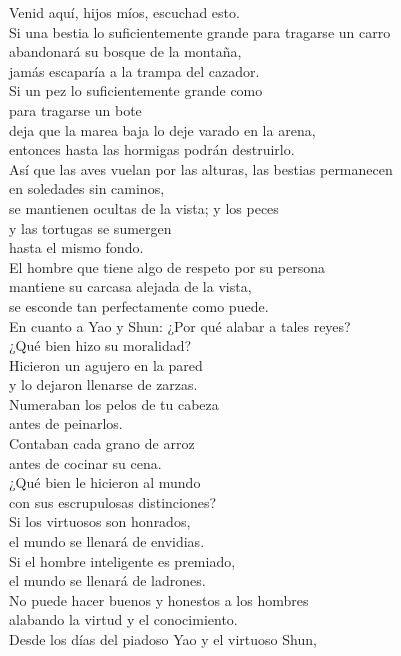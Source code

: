 \documentclass[book,b5paper,hidelinks,final]{memoir}
\begin{document}
	Venid aquí, hijos míos, escuchad esto.\\
	Si una bestia lo suficientemente grande para tragarse un carro\\
	abandonará su bosque de la montaña,\\
	jamás escaparía a la trampa del cazador.\\
	Si un pez lo suficientemente grande como\\
	para tragarse un bote\\
	deja que la marea baja lo deje varado en la arena,\\
	entonces hasta las hormigas podrán destruirlo.\\
	Así que las aves vuelan por las alturas, las bestias permanecen\\
	en soledades sin caminos,\\
	se mantienen ocultas de la vista; y los peces\\
	y las tortugas se sumergen\\
	hasta el mismo fondo.\\
	El hombre que tiene algo de respeto por su persona\\
	mantiene su carcasa alejada de la vista,\\
	se esconde tan perfectamente como puede.\\
	En cuanto a Yao y Shun: ¿Por qué alabar a tales reyes?\\
	¿Qué bien hizo su moralidad?\\
	Hicieron un agujero en la pared\\
	y lo dejaron llenarse de zarzas.\\
	Numeraban los pelos de tu cabeza\\
	antes de peinarlos.\\
	Contaban cada grano de arroz\\
	antes de cocinar su cena.\\
	¿Qué bien le hicieron al mundo\\
	con sus escrupulosas distinciones?\\
	Si los virtuosos son honrados,\\
	el mundo se llenará de envidias.\\
	Si el hombre inteligente es premiado,\\
	el mundo se llenará de ladrones.\\
	No puede hacer buenos y honestos a los hombres\\
	alabando la virtud y el conocimiento.\\
	Desde los días del piadoso Yao y el virtuoso Shun,\\
\end{document}
